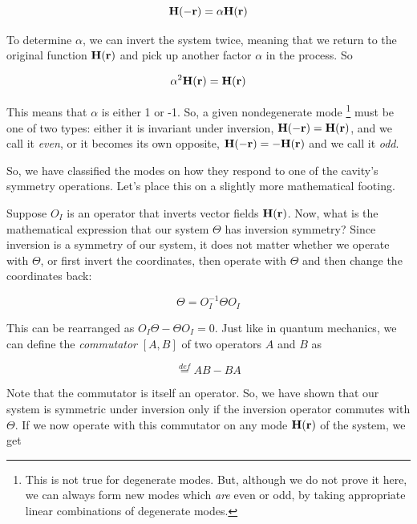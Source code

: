 \begin{equation}
{\bf H({\bf -r})} = \alpha {\bf H({\bf r})}
\end{equation} 

To determine $\alpha$, we can invert the system twice, meaning that we return to the original function ${\bf H({\bf r})}$ and pick up another factor $\alpha$ in the process. So

\begin{equation}
\alpha^2 {\bf H({\bf r})} = {\bf H({\bf r})}
\end{equation} 

This means that $\alpha$ is either 1 or -1. So, a given nondegenerate mode \footnote{This is not true for degenerate modes. But, although we do not prove it here, we can always form new modes which \emph{are} even or odd, by taking appropriate linear combinations of degenerate modes.} must be one of two types: either it is invariant under inversion, ${\bf H({\bf -r})} = {\bf H({\bf r})}$, and we call it \emph{even}, or it becomes its own opposite, ${\bf H({\bf -r})} = - {\bf H({\bf r})}$ and we call it \emph{odd}.

So, we have classified the modes on how they respond to one of the cavity's symmetry operations. Let's place this on a slightly more mathematical footing. 

Suppose $O_I$ is an operator that inverts vector fields ${\bf H({\bf r})}$. Now, what is the mathematical expression that our system $\Theta$ has inversion symmetry? Since inversion is a symmetry of our system, it does not matter whether we operate with $\Theta$, or first invert the coordinates, then operate with $\Theta$ and then change the coordinates back:

\begin{equation}
\Theta = O_I^{-1} \Theta O_I
\end{equation} 

This can be rearranged as $O_I \Theta - \Theta O_I = 0$. Just like in quantum mechanics, we can define the \emph{commutator} $[A,B]$ of two operators $A$ and $B$ as

\begin{equation}
[A,B] \stackrel{def}{=} AB - BA
\end{equation} 

Note that the commutator is itself an operator. So, we have shown that our system is symmetric under inversion only if the inversion operator commutes with $\Theta$. If we now operate with this commutator on any mode ${\bf H({\bf r})}$ of the system, we get


